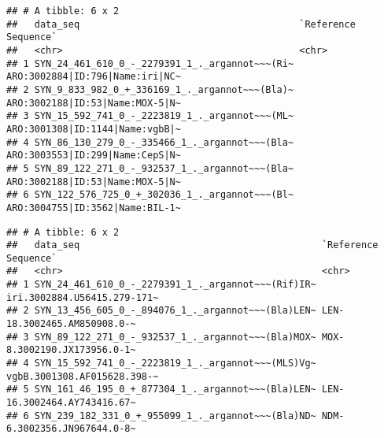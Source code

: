 \documentclass[
]{article}
\newenvironment{Shaded}{\begin{snugshade}}{\end{snugshade}}
\newcommand{\AttributeTok}[1]{\textcolor[rgb]{0.77,0.63,0.00}{#1}}
\newcommand{\ConstantTok}[1]{\textcolor[rgb]{0.00,0.00,0.00}{#1}}
\newcommand{\FunctionTok}[1]{\textcolor[rgb]{0.00,0.00,0.00}{#1}}
\newcommand{\NormalTok}[1]{#1}
\newcommand{\OtherTok}[1]{\textcolor[rgb]{0.56,0.35,0.01}{#1}}
\newcommand{\SpecialCharTok}[1]{\textcolor[rgb]{0.00,0.00,0.00}{#1}}
\newcommand{\StringTok}[1]{\textcolor[rgb]{0.31,0.60,0.02}{#1}}
\begin{document}
\begin{verbatim}
## # A tibble: 6 x 2
##   data_seq                                       `Reference Sequence`           
##   <chr>                                          <chr>                          
## 1 SYN_24_461_610_0_-_2279391_1_._argannot~~~(Ri~ ARO:3002884|ID:796|Name:iri|NC~
## 2 SYN_9_833_982_0_+_336169_1_._argannot~~~(Bla)~ ARO:3002188|ID:53|Name:MOX-5|N~
## 3 SYN_15_592_741_0_-_2223819_1_._argannot~~~(ML~ ARO:3001308|ID:1144|Name:vgbB|~
## 4 SYN_86_130_279_0_-_335466_1_._argannot~~~(Bla~ ARO:3003553|ID:299|Name:CepS|N~
## 5 SYN_89_122_271_0_-_932537_1_._argannot~~~(Bla~ ARO:3002188|ID:53|Name:MOX-5|N~
## 6 SYN_122_576_725_0_+_302036_1_._argannot~~~(Bl~ ARO:3004755|ID:3562|Name:BIL-1~
\end{verbatim}

\begin{Shaded}
\end{Shaded}

\begin{verbatim}
## # A tibble: 6 x 2
##   data_seq                                           `Reference Sequence`       
##   <chr>                                              <chr>                      
## 1 SYN_24_461_610_0_-_2279391_1_._argannot~~~(Rif)IR~ iri.3002884.U56415.279-171~
## 2 SYN_13_456_605_0_-_894076_1_._argannot~~~(Bla)LEN~ LEN-18.3002465.AM850908.0-~
## 3 SYN_89_122_271_0_-_932537_1_._argannot~~~(Bla)MOX~ MOX-8.3002190.JX173956.0-1~
## 4 SYN_15_592_741_0_-_2223819_1_._argannot~~~(MLS)Vg~ vgbB.3001308.AF015628.398-~
## 5 SYN_161_46_195_0_+_877304_1_._argannot~~~(Bla)LEN~ LEN-16.3002464.AY743416.67~
## 6 SYN_239_182_331_0_+_955099_1_._argannot~~~(Bla)ND~ NDM-6.3002356.JN967644.0-8~
\end{verbatim}
\end{document}
